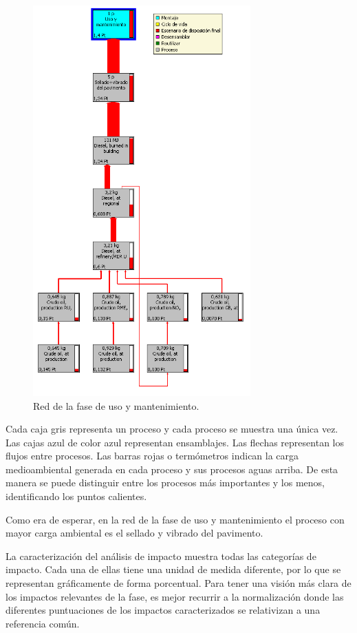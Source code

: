 \begin{figure}[!htb]
\centering
\includegraphics[height=15cm]{img/uso_red.png}
\caption{Red de la fase de uso y mantenimiento.}
\label{fig:uso_red}
\end{figure}

Cada caja gris representa un proceso y cada proceso se muestra una única vez. Las cajas azul de color azul representan ensamblajes. Las flechas representan los flujos entre procesos. Las barras rojas o termómetros indican la carga medioambiental generada en cada proceso y sus procesos aguas arriba. De esta manera se puede distinguir entre los procesos más importantes y los menos, identificando los puntos calientes.

Como era de esperar, en la red de la fase de uso y mantenimiento el proceso con mayor carga ambiental es el sellado y vibrado del pavimento.

La caracterización del análisis de impacto muestra todas las categorías de impacto. Cada una de ellas tiene una unidad de medida diferente, por lo que se representan gráficamente de forma porcentual. Para tener una visión más clara de los impactos relevantes de la fase, es mejor recurrir a la normalización donde las diferentes puntuaciones de los impactos caracterizados se relativizan a una referencia común.

